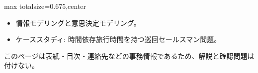\clearpage
{}
\begin{adjustbox}{max totalsize={\textwidth}{0.675\textheight},center}
\begin{minipage}{\textwidth}\scriptsize
\begin{minipage}[t]{0.485\textwidth}
\begin{itemize}
\item 情報モデリングと意思決定モデリング。
\item ケーススタディ: 時間依存旅行時間を持つ巡回セールスマン問題。
\end{itemize}
\end{minipage}\hfill
\begin{minipage}[t]{0.485\textwidth}
{\small このページは表紙・目次・連絡先などの事務情報であるため、解説と確認問題は付けない。}
\end{minipage}
\end{minipage}
\end{adjustbox}

